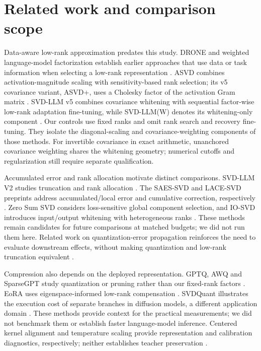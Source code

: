 \documentclass[conference]{IEEEtran}
\begin{document}
\section{Related work and comparison scope}
Data-aware low-rank approximation predates this study. DRONE and weighted language-model factorization establish earlier approaches that use data or task information when selecting a low-rank representation \cite{chen2021drone} \cite{hsu2022weighted}. ASVD combines activation-magnitude scaling with sensitivity-based rank selection; its v5 covariance variant, ASVD+, uses a Cholesky factor of the activation Gram matrix \cite{yuan2023asvd}. SVD-LLM v5 combines covariance whitening with sequential factor-wise low-rank adaptation fine-tuning, while SVD-LLM(W) denotes its whitening-only component \cite{wang2024svdllm}. Our controls use fixed ranks and omit rank search and recovery fine-tuning. They isolate the diagonal-scaling and covariance-weighting components of those methods. For invertible covariance in exact arithmetic, unanchored covariance weighting shares the whitening geometry; numerical cutoffs and regularization still require separate qualification.\par\smallskip
Accumulated error and rank allocation motivate distinct comparisons. SVD-LLM V2 studies truncation and rank allocation \cite{wang2025svdllmv2}. The SAES-SVD and LACE-SVD preprints address accumulated/local error and cumulative correction, respectively \cite{hu2026saessvd} \cite{liu2026lacesvd}. Zero Sum SVD considers loss-sensitive global component selection, and IO-SVD introduces input/output whitening with heterogeneous ranks \cite{abbasi2026zerosum} \cite{abbasi2026iosvd}. These methods remain candidates for future comparisons at matched budgets; we did not run them here. Related work on quantization-error propagation reinforces the need to evaluate downstream effects, without making quantization and low-rank truncation equivalent \cite{arai2025qep}.\par\smallskip
Compression also depends on the deployed representation. GPTQ, AWQ and SparseGPT study quantization or pruning rather than our fixed-rank factors \cite{frantar2022gptq} \cite{lin2023awq} \cite{frantar2023sparsegpt}. EoRA uses eigenspace-informed low-rank compensation \cite{liu2024eora}. SVDQuant illustrates the execution cost of separate branches in diffusion models, a different application domain \cite{li2024svdquant}. These methods provide context for the practical measurements; we did not benchmark them or establish faster language-model inference. Centered kernel alignment and temperature scaling provide representation and calibration diagnostics, respectively; neither establishes teacher preservation \cite{kornblith2019cka} \cite{guo2017calibration}.\par\smallskip
\end{document}
